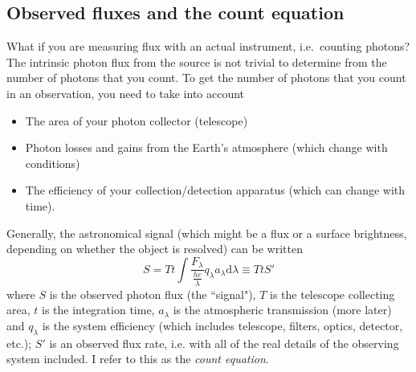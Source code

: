 \documentclass[12pt]{article}
\begin{document}

\subsection*{Observed fluxes and the count equation}
What if you are measuring flux with an actual instrument, i.e.\
counting photons? The intrinsic photon flux from the source is not
trivial to determine from the number of photons that you count. To get
the number of photons that you count in an observation, you need to
take into account
\begin{itemize}
    \item The area of your photon collector (telescope)
    \item Photon losses and gains from the Earth's atmosphere
    (which change with conditions)
    \item The efficiency of your collection/detection
    apparatus (which can change with time).
\end{itemize}
Generally, the astronomical signal (which might be a flux or a
surface brightness, depending on whether the object is resolved)
can be written
\begin{equation*}
    S = Tt \int \frac{F_{\lambda}}{\frac{hc}{\lambda}}q_{\lambda}
    a_{\lambda}\textrm{d}\lambda \equiv TtS'
\end{equation*}
where $S$ is the observed photon flux (the ``signal"), $T$ is the
telescope collecting area, $t$ is the integration time, $a_{\lambda}$
is the atmospheric transmission (more later) and
$q_{\lambda}$ is the system efficiency (which includes
telescope, filters, optics, detector, etc.); $S'$ is an observed flux
rate, i.e. with all of the real details of the observing system
included. I refer to this as the \emph{count equation}.\\
\end{document}
